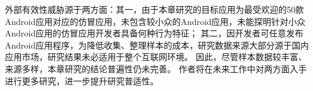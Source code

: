 外部有效性威胁源于两方面：其一，由于本章研究的目标应用为最受欢迎的50款Android应用对应的仿冒应用，未包含较小众的Android应用，未能探明针对小众Android应用的仿冒应用开发者具备何种行为特征；
其二，因开发者可任意发布Android应用程序，为降低收集、整理样本的成本，研究数据来源大部分源于国内应用市场，研究结果未必适用于整个互联网环境。
因此，尽管样本数据较丰富、来源多样，本章研究的结论普遍性仍未完善。
作者将在未来工作中对两方面入手进行更多研究，进一步提升研究普适性。




